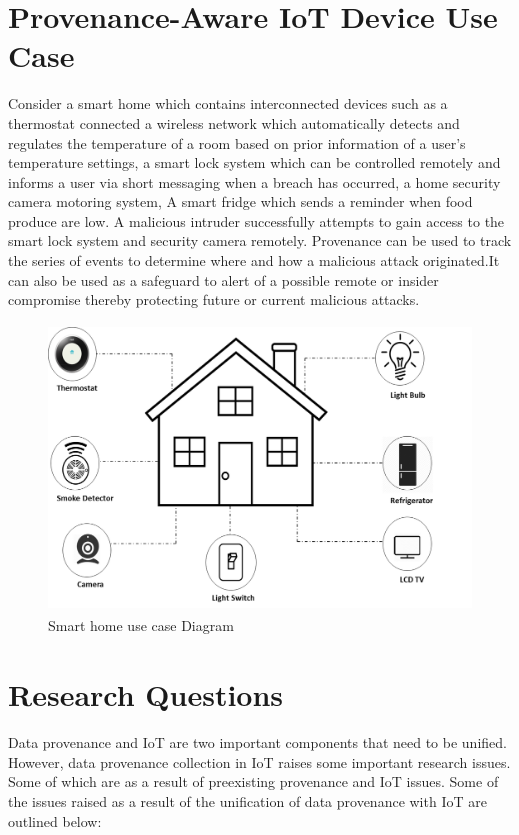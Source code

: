 \section{Provenance-Aware IoT Device Use Case}

Consider a smart home which contains interconnected devices such as a thermostat connected a wireless network which automatically detects and regulates the temperature of a room based on prior information of a user's temperature settings, a smart lock system which can be controlled remotely and informs a user via short messaging when a breach has occurred, a home security camera motoring system, A smart fridge which sends a reminder when food produce are low. A malicious intruder successfully attempts  to gain access to the smart lock system and security camera remotely. Provenance can be used to track the series  of events to determine where and how a malicious attack originated.It can also be used as a safeguard to alert of a possible remote or insider compromise thereby protecting future or current malicious attacks. 

\begin{figure}[h!]
\begin{center}

\includegraphics[height=3in]{smart_home.png}
\end{center}
\caption{Smart home use case Diagram}

\end{figure}



\section{Research Questions}
Data provenance and IoT are two important components that need to be unified. However, data provenance collection in IoT raises some important research issues. Some of which are as a result of preexisting provenance and IoT issues. Some of the issues raised as a result of the unification of data provenance with IoT are outlined below:

